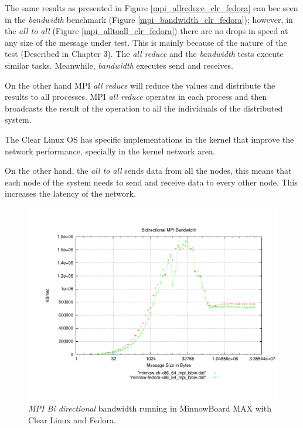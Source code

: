 The same results as presented in Figure \ref{mpi_allreduce_clr_fedora} can bee
seen in the \textit{bandwidth} benchmark (Figure
\ref{mpi_bandwidth_clr_fedora}); however, in the \textit{all to all} (Figure
\ref{mpi_alltoall_clr_fedora}) there are no drops in speed at any size of the
message under test.  This is mainly because of the nature of the test
(Described in Chapter 3). The \textit{all reduce} and the \textit{bandwidth}
tests execute similar tasks. Meanwhile, \textit{bandwidth} executes send and
receives.

On the other hand MPI \textit{all reduce} will reduce the values and distribute
the results to all processes. MPI \textit{all reduce} operates in each process
and then broadcasts the result of the operation to all the individuals of the
distributed system.

The Clear Linux OS has specific implementations in the kernel that improve the
network performance, specially in the kernel network area.

On the other hand, the \textit{all to all} sends data from all the nodes, this
means that each node of the system needs to send and receive data to every
other node. This increases the latency of the network.

\begin{figure}[H]
\centering
\includegraphics[width=1 \textwidth]{images/mpbench_clr_experiments/mpi_bibw.pdf}
\caption{\textit{MPI Bi directional} bandwidth running in  MinnowBoard MAX with Clear Linux
and Fedora.}
\label{mpi_bibw_clr_fedora}
\end{figure}

